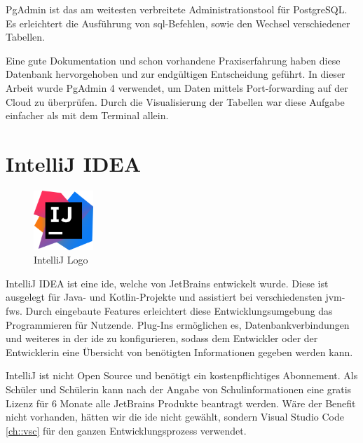 PgAdmin ist das am weitesten verbreitete Administrationstool für PostgreSQL. 
\cite{PgAdminAbout}
Es erleichtert die Ausführung von \gls{sql}-Befehlen, sowie den Wechsel verschiedener Tabellen.

Eine gute Dokumentation und schon vorhandene Praxiserfahrung haben diese Datenbank hervorgehoben und zur endgültigen Entscheidung geführt. 
In dieser Arbeit wurde PgAdmin 4 verwendet, um Daten mittels Port-forwarding auf der Cloud zu überprüfen. 
Durch die Visualisierung der Tabellen war diese Aufgabe einfacher als mit dem Terminal allein. 



\section{IntelliJ IDEA}
\begin{figure}
  \begin{center}
      \includegraphics[width=0.2\textwidth]{pics/logos/intellij.png}
      \caption{IntelliJ Logo}
  \end{center}
\end{figure}
IntelliJ IDEA ist eine \gls{ide}, welche von JetBrains entwickelt wurde. 
Diese ist ausgelegt für Java- und Kotlin-Projekte und assistiert bei verschiedensten \gls{jvm}-\glspl{fw}. 
Durch eingebaute Features erleichtert diese Entwicklungsumgebung das Programmieren für Nutzende. 
Plug-Ins ermöglichen es, Datenbankverbindungen und weiteres in der \gls{ide} zu konfigurieren, sodass dem Entwickler oder der Entwicklerin eine Übersicht von benötigten Informationen gegeben werden kann.
\cite{IntelliJIDEA}

IntelliJ ist nicht Open Source und benötigt ein kostenpflichtiges Abonnement. 
Als Schüler und Schülerin kann nach der Angabe von Schulinformationen eine gratis Lizenz für 6 Monate alle JetBrains Produkte beantragt werden. 
Wäre der Benefit nicht vorhanden, hätten wir die \gls{ide} nicht gewählt, sondern Visual Studio Code \ref{ch::vsc} für den ganzen Entwicklungsprozess verwendet. 
\cite{IntelliJIDEAPricing}

